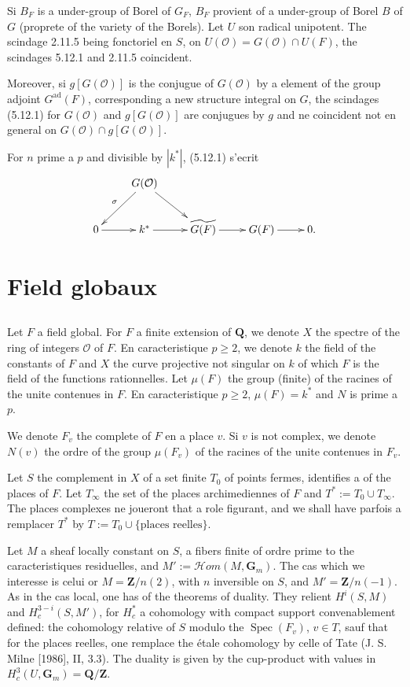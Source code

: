 \documentclass[11pt,a4paper]{article}
\theoremstyle{plain}
\theoremstyle{definition}
\DeclareMathOperator{\Spec}{Spec}
\DeclareMathOperator{\ad}{ad}
\begin{document}
Si $B_F$ is a under-group of Borel of $G_F$, $B_F$ provient of a under-group of Borel $B$ of $G$ (proprete of the variety of the Borels). Let $U$ son radical unipotent. The scindage 2.11.5 being fonctoriel en $S$, on $U(\mathcal{O}) = G(\mathcal{O}) \cap U(F)$, the scindages 5.12.1 and 2.11.5 coincident.

Moreover, si $g[G(\mathcal{O})]$ is the conjugue of $G(\mathcal{O})$ by a element of the group adjoint $G^{\ad}(F)$, corresponding a new structure integral on $G$, the scindages (5.12.1) for $G(\mathcal{O})$ and $g[G(\mathcal{O})]$ are conjugues by $g$ and ne coincident not en general on $G(\mathcal{O}) \cap g[G(\mathcal{O})]$.

For $n$ prime a $p$ and divisible by $|k^*|$, (5.12.1) s'ecrit
\[
\xymatrix{
& G(\mathcal{O}) \ar[dl]_{\sigma} \ar[dr] & \\
0 \ar[r] & k^* \ar[r] & \widetilde{G(F)} \ar[r] & G(F) \ar[r] & 0.
}
\]

\section{Field globaux}

\subsection{}\label{6.1}

Let $F$ a field global. For $F$ a finite extension of $\mathbf{Q}$, we denote $X$ the spectre of the ring of integers $\mathcal{O}$ of $F$. En caracteristique $p \geq 2$, we denote $k$ the field of the constants of $F$ and $X$ the curve projective not singular on $k$ of which $F$ is the field of the functions rationnelles. Let $\mu(F)$ the group (finite) of the racines of the unite contenues in $F$. En caracteristique $p \geq 2$, $\mu(F) = k^*$ and $N$ is prime a $p$.

We denote $F_v$ the complete of $F$ en a place $v$. Si $v$ is not complex, we denote $N(v)$ the ordre of the group $\mu(F_v)$ of the racines of the unite contenues in $F_v$.

Let $S$ the complement in $X$ of a set finite $T_0$ of points fermes, identifies a of the places of $F$. Let $T_\infty$ the set of the places archimediennes of $F$ and $T^* := T_0 \cup T_\infty$. The places complexes ne joueront that a role figurant, and we shall have parfois a remplacer $T^*$ by $T := T_0 \cup \{\text{places reelles}\}$.

Let $M$ a sheaf locally constant on $S$, a fibers finite of ordre prime to the caracteristiques residuelles, and $M' := \mathscr{H}om(M, \mathbf{G}_m)$. The cas which we interesse is celui or $M = \mathbf{Z}/n(2)$, with $n$ inversible on $S$, and $M' = \mathbf{Z}/n(-1)$. As in the cas local, one has of the theorems of duality. They relient $H^i(S, M)$ and $H^{3-i}_c(S, M')$, for $H^*_c$ a cohomology with compact support convenablement defined: the cohomology relative of $S$ modulo the $\Spec(F_v)$, $v \in T$, sauf that for the places reelles, one remplace the étale cohomology by celle of Tate (J. S. Milne [1986], II, 3.3). The duality is given by the cup-product with values in $H^3_c(U, \mathbf{G}_m) = \mathbf{Q}/\mathbf{Z}$.
\end{document}

